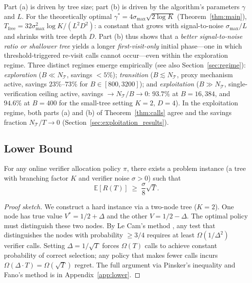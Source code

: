 \begin{remark}
\label{rem:regime_calls}
Part (a) is driven by tree size; part (b) is driven by the algorithm's parameters
$\gamma$ and $L$. For the theoretically optimal $\gamma^* = 4\sigma_{\max}\sqrt{2\log K}$
(Theorem~\ref{thm:main}), $T_{\mathrm{free}} = 32\sigma_{\max}^2\log K / (L^2D^2)$:
a constant that grows with signal-to-noise $\sigma_{\max}/L$ and shrinks with tree
depth $D$. Part (b) thus shows that a \emph{better signal-to-noise ratio or shallower
tree} yields a longer \emph{first-visit-only} initial phase---one in which
threshold-triggered re-visit calls cannot occur---even within the exploration regime.
Three distinct regimes emerge empirically (see also Section~\ref{sec:regime}):
\emph{exploration} ($B \ll N_{\mathcal{T}}$, savings ${<}5\%$);
\emph{transition} ($B \lesssim N_{\mathcal{T}}$, proxy mechanism active,
savings $23\%$--$73\%$ for $B \in [800, 3200]$);
and \emph{exploitation} ($B \gg N_{\mathcal{T}}$, single-verification ceiling active,
savings $\to N_{\mathcal{T}}/B \to 0$: $93.7\%$ at $B{=}16{,}384$,
and $94.6\%$ at $B{=}400$ for the small-tree setting $K{=}2$, $D{=}4$).
In the exploitation regime, both parts (a) and (b) of Theorem~\ref{thm:calls} agree
and the savings fraction $N_{\mathcal{T}}/T \to 0$
(Section~\ref{sec:exploitation_results}).
\end{remark}

\subsection{Lower Bound}

\begin{theorem}
\label{thm:lower}
For any online verifier allocation policy $\pi$, there exists a problem instance
(a tree with branching factor $K$ and verifier noise $\sigma > 0$) such that
\[
  \mathbb{E}[R(T)] \;\geq\; \frac{\sigma}{8}\sqrt{T}.
\]
\end{theorem}

\begin{proof}[Proof sketch]
We construct a hard instance via a two-node tree ($K=2$). One node has true value
$V^* = 1/2 + \Delta$ and the other $V = 1/2 - \Delta$. The optimal policy must
distinguish these two nodes. By Le Cam's method \citep{lecam1973convergence}, any
test that distinguishes the nodes with probability $\geq 3/4$ requires at least
$\Omega(1/\Delta^2)$ verifier calls. Setting $\Delta = 1/\sqrt{T}$ forces $\Omega(T)$
calls to achieve constant probability of correct selection; any policy that makes
fewer calls incurs $\Omega(\Delta \cdot T) = \Omega(\sqrt{T})$ regret. The full
argument via Pinsker's inequality and Fano's method is in Appendix~\ref{app:lower}.
\end{proof}

